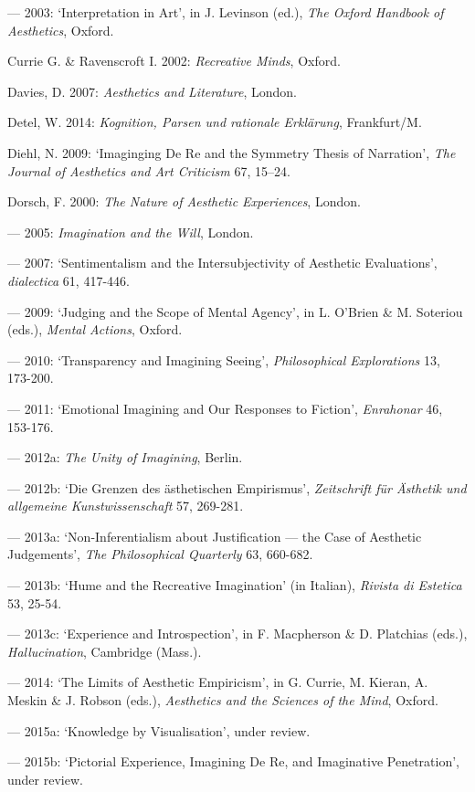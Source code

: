 \begin{hangparas}{.5cm}{1}
--- 2003: `Interpretation in Art', in J. Levinson (ed.), \emph{The Oxford Handbook of Aesthetics}, Oxford.

Currie G. \& Ravenscroft I. 2002: \emph{Recreative Minds}, Oxford.

Davies, D. 2007: \emph{Aesthetics and Literature}, London.

Detel, W. 2014: \emph{Kognition, Parsen und rationale Erkl\"arung}, Frankfurt/M.

Diehl, N. 2009: `Imaginging De Re and the Symmetry Thesis of Narration', \emph{The Journal of Aesthetics and Art Criticism} 67, 15--24.

Dorsch, F. 2000: \emph{The Nature of Aesthetic Experiences}, London.

--- 2005: \emph{Imagination and the Will}, London.
 
--- 2007: `Sentimentalism and the Intersubjectivity of Aesthetic Evaluations', \emph{dialectica} 61, 417-446. 
 
--- 2009: `Judging and the Scope of Mental Agency', in L. O'Brien \& M. Soteriou (eds.), \emph{Mental Actions}, Oxford. 
 
--- 2010: `Transparency and Imagining Seeing', \emph{Philosophical Explorations} 13, 173-200. 
 
--- 2011: `Emotional Imagining and Our Responses to Fiction', \emph{Enrahonar} 46, 153-176. 
 
--- 2012a: \emph{The Unity of Imagining}, Berlin.

--- 2012b: `Die Grenzen des \"asthetischen Empirismus', \emph{Zeitschrift f\"ur \"Asthetik und allgemeine Kunstwissenschaft} 57, 269-281.
 
--- 2013a: `Non-Inferentialism about Justification --- the Case of Aesthetic Judgements', \emph{The Philosophical Quarterly} 63, 660-682.

--- 2013b: `Hume and the Recreative Imagination' (in Italian), \emph{Rivista di Estetica} 53, 25-54. 

--- 2013c: `Experience and Introspection', in F. Macpherson \& D. Platchias (eds.), \emph{Hallucination}, Cambridge (Mass.). 

--- 2014: `The Limits of Aesthetic Empiricism', in G. Currie, M. Kieran, A. Meskin \& J. Robson (eds.), \emph{Aesthetics and the Sciences of the Mind}, Oxford. 

--- 2015a: `Knowledge by Visualisation', under review.

--- 2015b: `Pictorial Experience, Imagining De Re, and Imaginative Penetration', under review.


\end{hangparas}
